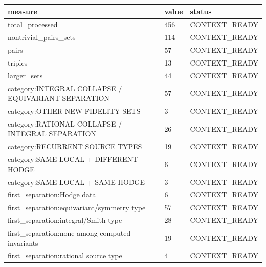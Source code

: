 \begin{tabular}{lll}
\hline
measure & value & status \\
\hline
total\_processed & 456 & CONTEXT\_READY \\
nontrivial\_pairs\_sets & 114 & CONTEXT\_READY \\
pairs & 57 & CONTEXT\_READY \\
triples & 13 & CONTEXT\_READY \\
larger\_sets & 44 & CONTEXT\_READY \\
category:INTEGRAL COLLAPSE / EQUIVARIANT SEPARATION & 57 & CONTEXT\_READY \\
category:OTHER NEW FIDELITY SETS & 3 & CONTEXT\_READY \\
category:RATIONAL COLLAPSE / INTEGRAL SEPARATION & 26 & CONTEXT\_READY \\
category:RECURRENT SOURCE TYPES & 19 & CONTEXT\_READY \\
category:SAME LOCAL + DIFFERENT HODGE & 6 & CONTEXT\_READY \\
category:SAME LOCAL + SAME HODGE & 3 & CONTEXT\_READY \\
first\_separation:Hodge data & 6 & CONTEXT\_READY \\
first\_separation:equivariant/symmetry type & 57 & CONTEXT\_READY \\
first\_separation:integral/Smith type & 28 & CONTEXT\_READY \\
first\_separation:none among computed invariants & 19 & CONTEXT\_READY \\
first\_separation:rational source type & 4 & CONTEXT\_READY \\
\hline
\end{tabular}

